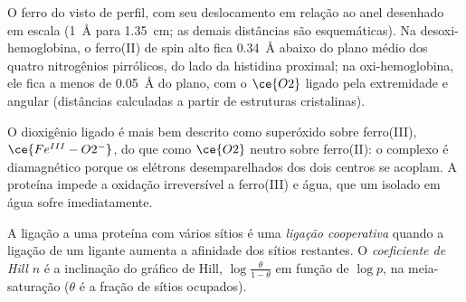 \begin{omfigure}

{\small O ferro do  visto de perfil, com seu deslocamento em relação ao anel desenhado em
escala (1~\AA{} para 1.35~cm; as demais distâncias são esquemáticas). Na desoxi-hemoglobina, o ferro(II) de spin alto fica
\qty{0.34}{\angstrom} abaixo do plano médio dos quatro nitrogênios pirrólicos, do lado da
histidina proximal; na oxi-hemoglobina, ele fica a menos de \qty{0.05}{\angstrom} do plano, com o $\ce{O2}$
ligado pela extremidade e angular (distâncias calculadas a partir de estruturas cristalinas).}
\end{omfigure}

O dioxigênio ligado é mais bem descrito como superóxido sobre ferro(III), $\ce{Fe^{III}-O2^-}$, do que como
$\ce{O2}$ neutro sobre ferro(II): o complexo é diamagnético porque os elétrons
desemparelhados dos dois centros se acoplam. A proteína impede a oxidação
irreversível a ferro(III) e água, que um  isolado em água sofre
imediatamente.

\begin{definition}\label{def:b3:bioinorganic:cooperativity}
A ligação a uma proteína com vários sítios é uma \emph{ligação cooperativa}
quando a ligação de um ligante aumenta a afinidade dos sítios
restantes. O \emph{coeficiente de Hill} $n$ é a inclinação do
gráfico de Hill, $\log\frac{\theta}{1 - \theta}$ em função de $\log p$, na meia-saturação ($\theta$ é a fração de sítios
ocupados).
\end{definition}

